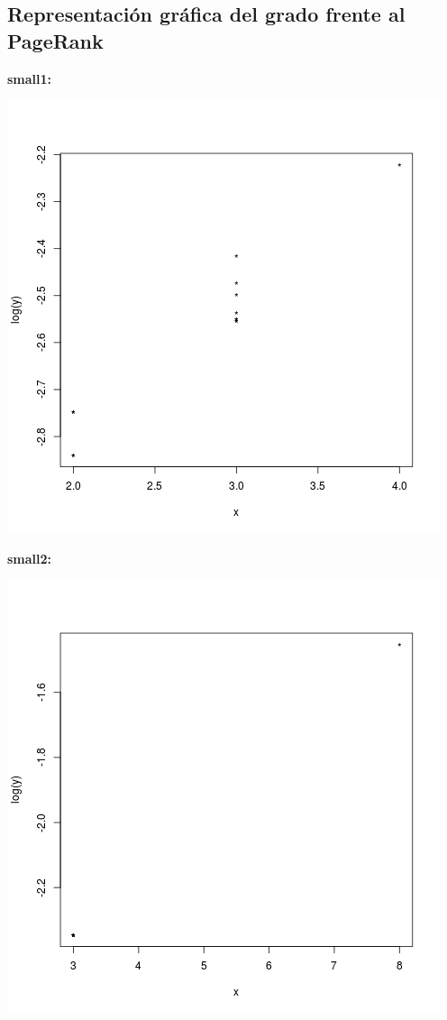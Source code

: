 \documentclass[palatino,nochap]{apuntes}
\begin{document}
\subsection{Representación gráfica del grado frente al PageRank }

\textbf{small1:}

\begin{center}
	\includegraphics[scale=0.45]{img/small1_grado-pr}
\end{center}


\textbf{small2:}

\begin{center}
	\includegraphics[scale=0.45]{img/small2_grado-pr}
\end{center}
\end{document}
